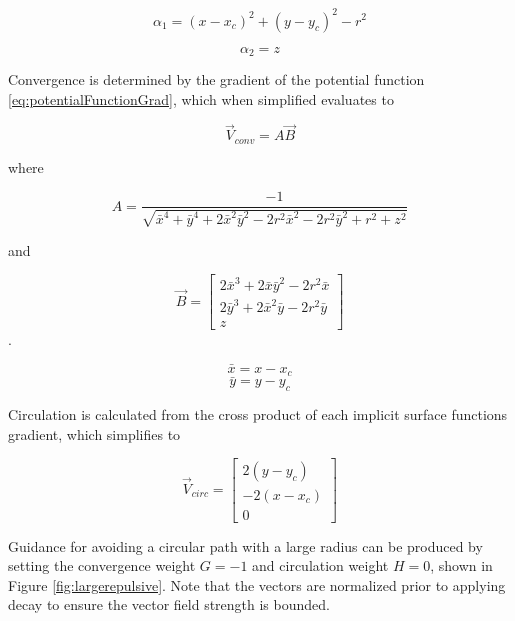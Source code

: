 \documentclass[conf]{new-aiaa}
\begin{document}
\begin{equation}\label{eq:alphaCylinder}
\alpha_1 = (x-x_c)^2 + (y-y_c)^2-r^2
\end{equation}

\begin{equation}\label{eq:alphaPlane}
\alpha_2 = z
\end{equation}

Convergence is determined by the gradient of the potential function \ref{eq:potentialFunctionGrad}, which when simplified evaluates to

\begin{equation}
\overrightarrow{V}_{conv} = A\overrightarrow{B}
\end{equation}

where


\begin{equation}
A = \dfrac{-1}{\sqrt{\bar{x}^4+\bar{y}^4+2\bar{x}^2\bar{y}^2-2r^2\bar{x}^2-2r^2\bar{y}^2+r^2+z^2}}
\end{equation}

and

\begin{equation}
\overrightarrow{B} = \begin{bmatrix} 2\bar{x}^3+2\bar{x}\bar{y}^2-2r^2\bar{x} \\ 2\bar{y}^3+2\bar{x}^2\bar{y}-2r^2\bar{y} \\z \end{bmatrix}
\end{equation}.




\begin{equation}
\bar{x} = x - x_c
\end{equation}
\begin{equation}
\bar{y} = y - y_c
\end{equation}

Circulation is calculated from the cross product of each implicit surface functions gradient, which simplifies to

\begin{equation}\label{eq:vcirc_circle}
\overrightarrow{V}_{circ} =  \begin{bmatrix}  2(y-y_c) \\[6pt] -2(x-x_c) \\[6pt] 0\end{bmatrix}
\end{equation}

Guidance for avoiding a circular path with a large radius can be produced by setting the convergence weight $G=-1$ and circulation weight $H=0$, shown in Figure \ref{fig:largerepulsive}. Note that the vectors are normalized prior to applying decay to ensure the vector field strength is bounded.
\end{document}
